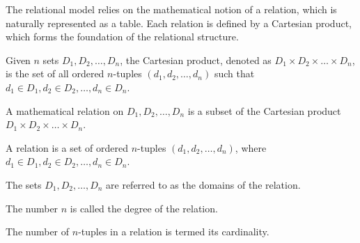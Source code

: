 The relational model relies on the mathematical notion of a relation, which is naturally represented as a table.
Each relation is defined by a Cartesian product, which forms the foundation of the relational structure.
\begin{definition}
    Given $n$ sets $D_1, D_2, \dots, D_n$, the Cartesian product, denoted as $D_1 \times D_2 \times \dots \times D_n$, is the set of all ordered $n$-tuples $(d_1, d_2, \dots, d_n)$ such that $d_1 \in D_1, d_2 \in D_2, \dots, d_n \in D_n$. 
\end{definition}
\begin{definition}
    A mathematical relation on $D_1, D_2, \dots, D_n$ is a subset of the Cartesian product $D_1 \times D_2 \times \dots \times D_n$. 
\end{definition}
\begin{definition}
    A relation is a set of ordered $n$-tuples $(d_1, d_2, \dots, d_n)$, where $d_1 \in D_1, d_2 \in D_2, \dots, d_n \in D_n$. 
\end{definition}
\begin{definition}
    The sets $D_1, D_2, \dots, D_n$ are referred to as the domains of the relation.
\end{definition}
\begin{definition}
    The number $n$ is called the degree of the relation.
\end{definition}
\begin{definition}
    The number of $n$-tuples in a relation is termed its cardinality.
\end{definition}

